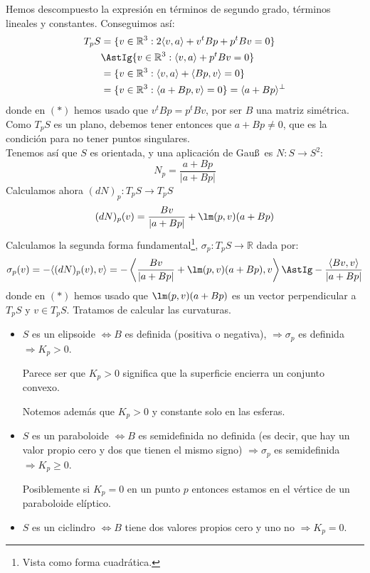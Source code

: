 \begin{ejemplo}
    Hemos descompuesto la expresión en términos de segundo grado, términos lineales y constantes. Conseguimos así:
    \begin{align*}
        T_pS &= \{v\in \mathbb{R}^3 : 2\langle v,a \rangle +v^tBp + p^tBv = 0\} \\
             &\AstIg \{v\in \mathbb{R}^3 : \langle v,a \rangle +p^tBv = 0\} \\
             &= \{v\in \mathbb{R}^3 : \langle v,a \rangle + \langle Bp,v \rangle = 0 \} \\
             &= \{v\in \mathbb{R}^3 : \langle a+Bp,v \rangle =0\} = \langle a+Bp \rangle^\perp
    \end{align*}
    donde en $(\ast)$ hemos usado que $v^tBp = p^tBv$, por ser $B$ una matriz simétrica. Como $T_pS$ es un plano, debemos tener entonces que $a+Bp \neq 0$, que es la condición para no tener puntos singulares.\\

    \noindent
    Tenemos así que $S$ es orientada, y una aplicación de Gau\ss\ es $N:S\to S^2$:
    \begin{equation*}
        N_p = \frac{a+Bp}{|a+Bp|}
    \end{equation*}
    Calculamos ahora $(dN)_p:T_pS\to T_pS$
    \begin{equation*}
        (dN)_p(v) = \frac{Bv}{|a+Bp|} + \lm(p,v)(a + Bp)
    \end{equation*}
    Calculamos la segunda forma fundamental\footnote{Vista como forma cuadrática.}, $\sigma_p:T_pS\to\mathbb{R}$ dada por:
    \begin{equation*}
        \sigma_p(v) = -\langle (dN)_p(v),v \rangle = - \left\langle \frac{Bv}{|a+Bp|}+\lm(p,v)(a+Bp),v \right\rangle  \AstIg -\frac{\langle Bv,v \rangle}{|a+Bp|} 
    \end{equation*}
    donde en $(\ast)$ hemos usado que $\lm(p,v)(a+Bp)$ es un vector perpendicular a $T_pS$ y $v\in T_pS$. Tratamos de calcular las curvaturas.
    \begin{itemize}
        \item $S$ es un elipsoide $\Longleftrightarrow B$ es definida (positiva o negativa), $\Longrightarrow \sigma_p$ es definida $\Longrightarrow K_p>0$.

            Parece ser que $K_p>0$ significa que la superficie encierra un conjunto convexo.

            Notemos además que $K_p>0$ y constante solo en las esferas.
        \item $S$ es un paraboloide $\Longleftrightarrow B$ es semidefinida no definida (es decir, que hay un valor propio cero y dos que tienen el mismo signo) $\Longrightarrow \sigma_p$ es semidefinida $\Longrightarrow K_p\geq 0$.

            Posiblemente si $K_p = 0$ en un punto $p$ entonces estamos en el vértice de un paraboloide elíptico.

        \item $S$ es un ciclindro $\Longleftrightarrow B$ tiene dos valores propios cero y uno no $\Longrightarrow K_p = 0$.
    \end{itemize}
\end{ejemplo}

